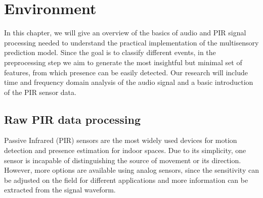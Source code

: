 \chapter{Environment}
\label{chapter:environment}



In this chapter, we will give an overview of the basics of audio and PIR signal processing needed to understand the practical implementation of the multisensory prediction model. Since the goal is to classify different events, in the preprocessing step we aim to generate the most insightful but minimal set of features, from which presence can be easily detected. Our research will include time and frequency domain analysis of the audio signal and a basic introduction of the PIR sensor data.



\section{Raw PIR data processing}

Passive Infrared (PIR) sensors are the most widely used devices for motion detection and presence estimation for indoor spaces. Due to its simplicity, one sensor is incapable of distinguishing the source of movement or its direction. However, more options are available using analog sensors, since the sensitivity can be adjusted on the field for different applications and more information can be extracted from the signal waveform.

